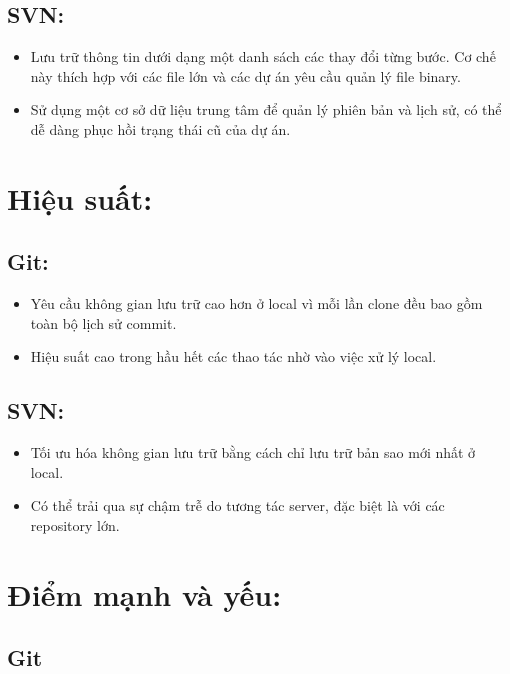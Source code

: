 \subsection{SVN:}
\begin{itemize}
    \item Lưu trữ thông tin dưới dạng một danh sách các thay đổi từng bước. Cơ chế này thích hợp với các file lớn và các dự án yêu cầu quản lý file binary.
    \item Sử dụng một cơ sở dữ liệu trung tâm để quản lý phiên bản và lịch sử, có thể dễ dàng phục hồi trạng thái cũ của dự án.
\end{itemize}

\section{Hiệu suất:}
\subsection{Git:}
\begin{itemize}
    \item Yêu cầu không gian lưu trữ cao hơn ở local vì mỗi lần clone đều bao gồm toàn bộ lịch sử commit.
    \item Hiệu suất cao trong hầu hết các thao tác nhờ vào việc xử lý local.
\end{itemize}

\subsection{SVN:}
\begin{itemize}
    \item Tối ưu hóa không gian lưu trữ bằng cách chỉ lưu trữ bản sao mới nhất ở local.
    \item Có thể trải qua sự chậm trễ do tương tác server, đặc biệt là với các repository lớn.
\end{itemize}

\section{Điểm mạnh và yếu:}
\subsection{Git}
